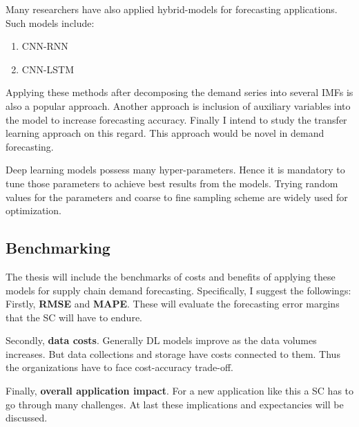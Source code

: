 Many researchers have also applied hybrid-models for forecasting applications. Such models include:
\begin{enumerate}
    \item{CNN-RNN}
    \item{CNN-LSTM}
\end{enumerate}

Applying these methods after decomposing the demand series into several IMFs is also a popular approach. Another approach is inclusion of auxiliary variables into the model to increase forecasting accuracy. Finally I intend to study the transfer learning approach on this regard. This approach would be novel in demand forecasting.

Deep learning models possess many hyper-parameters. Hence it is mandatory to tune those parameters to achieve best results from the models. Trying random values for the parameters and coarse to fine sampling scheme are widely used for optimization. 

\subsection{Benchmarking}
The thesis will include the benchmarks of costs and benefits of applying these models for supply chain demand forecasting. Specifically, I suggest the followings: \\

Firstly, \textbf{RMSE} and \textbf{MAPE}. These will evaluate the forecasting error margins that the SC will have to endure.

Secondly, \textbf{data costs}. Generally DL models improve as the data volumes increases. But data collections and storage have costs connected to them. Thus the organizations have to face cost-accuracy trade-off.

Finally, \textbf{overall application impact}. For a new application like this a SC has to go through many challenges. At last these implications and expectancies will be discussed. 


